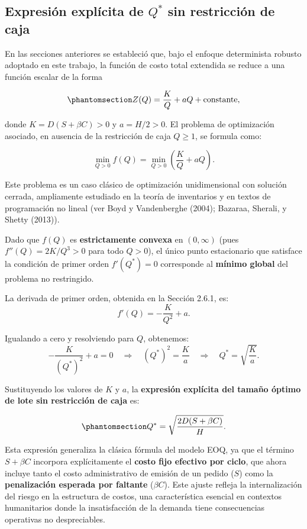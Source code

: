 \documentclass[
  spanish,
  us-letterpaper,
  DIV=11,
  numbers=noendperiod]{scrreprt}
\numberwithin{equation}{section}
\begin{document}
\subsection{\texorpdfstring{Expresión explícita de \(Q^*\) sin
restricción de
caja}{Expresión explícita de Q\^{}* sin restricción de caja}}\label{expresiuxf3n-expluxedcita-de-q-sin-restricciuxf3n-de-caja}

En las secciones anteriores se estableció que, bajo el enfoque
determinista robusto adoptado en este trabajo, la función de costo total
extendida se reduce a una función escalar de la forma

\begin{equation}\phantomsection\label{eq-ZQ_sin_caja}{
Z(Q) = \frac{K}{Q} + a Q + \text{constante},
}\end{equation}

donde \(K = D(S + \beta C) > 0\) y \(a = H/2 > 0\). El problema de
optimización asociado, en ausencia de la restricción de caja
\(Q \geq 1\), se formula como:

\[
\min_{Q > 0} f(Q) = \min_{Q > 0} \left( \frac{K}{Q} + a Q \right).
\]

Este problema es un caso clásico de optimización unidimensional con
solución cerrada, ampliamente estudiado en la teoría de inventarios y en
textos de programación no lineal (ver Boyd y Vandenberghe (2004);
Bazaraa, Sherali, y Shetty (2013)).

Dado que \(f(Q)\) es \textbf{estrictamente convexa} en \((0, \infty)\)
(pues \(f''(Q) = 2K/Q^3 > 0\) para todo \(Q > 0\)), el único punto
estacionario que satisface la condición de primer orden \(f'(Q^*) = 0\)
corresponde al \textbf{mínimo global} del problema no restringido.

La derivada de primer orden, obtenida en la Sección 2.6.1, es: \[
f'(Q) = -\frac{K}{Q^2} + a.
\]

Igualando a cero y resolviendo para \(Q\), obtenemos: \[
-\frac{K}{(Q^*)^2} + a = 0
\quad\Longrightarrow\quad
(Q^*)^2 = \frac{K}{a}
\quad\Longrightarrow\quad
Q^* = \sqrt{\frac{K}{a}}.
\]

Sustituyendo los valores de \(K\) y \(a\), la \textbf{expresión
explícita del tamaño óptimo de lote sin restricción de caja} es:

\begin{equation}\phantomsection\label{eq-Qstar_sin_caja}{
Q^* = \sqrt{\frac{2 D (S + \beta C)}{H}}.
}\end{equation}

Esta expresión generaliza la clásica fórmula del modelo EOQ, ya que el
término \(S + \beta C\) incorpora explícitamente el \textbf{costo fijo
efectivo por ciclo}, que ahora incluye tanto el costo administrativo de
emisión de un pedido (\(S\)) como la \textbf{penalización esperada por
faltante} (\(\beta C\)). Este ajuste refleja la internalización del
riesgo en la estructura de costos, una característica esencial en
contextos humanitarios donde la insatisfacción de la demanda tiene
consecuencias operativas no despreciables.
\end{document}
